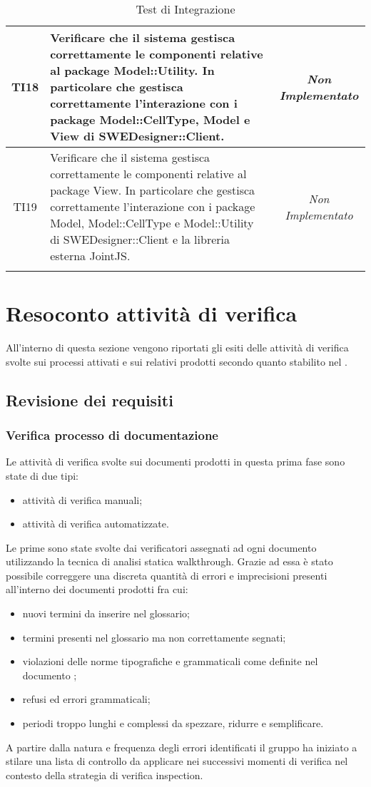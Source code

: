 \begin{longtable}{|c|>{}m{8cm}|c|}
\hypertarget{TI18}{TI18} & Verificare che il sistema gestisca correttamente le componenti relative al package Model::Utility. In particolare che gestisca correttamente l'interazione con i package Model::CellType, Model e View di SWEDesigner::Client. & \textit{Non Implementato}\\ \hline
\hypertarget{TI19}{TI19} & Verificare che il sistema gestisca correttamente le componenti relative al package View. In particolare che gestisca correttamente l'interazione con i package Model, Model::CellType e Model::Utility di SWEDesigner::Client e la libreria esterna JointJS. & \textit{Non Implementato}\\ \hline
\caption[Test di Integrazione]{Test di Integrazione}
\label{tabella:test2}
\end{longtable}
\clearpage
	



\section{Resoconto attività di verifica}
All'interno di questa sezione vengono riportati gli esiti delle attività di verifica svolte sui processi attivati e sui relativi prodotti secondo quanto stabilito nel \PdP.
	\subsection{Revisione dei requisiti}
		\subsubsection{Verifica processo di documentazione}
		Le attività di verifica svolte sui documenti prodotti in questa prima fase sono state di due tipi:
		\begin{itemize}		
			\item attività di verifica manuali;
			\item attività di verifica automatizzate.
		\end{itemize}
		
		Le prime sono state svolte dai verificatori assegnati ad ogni documento utilizzando la tecnica di 					analisi statica walkthrough. Grazie ad essa è stato possibile correggere una discreta quantità di 					errori e imprecisioni presenti all'interno dei documenti prodotti fra cui: 
		\begin{itemize}	
			\item nuovi termini da inserire nel glossario;
			\item termini presenti nel glossario ma non correttamente segnati;
			\item violazioni delle norme tipografiche e grammaticali come definite nel documento \NdP ;
			\item refusi ed errori grammaticali;
			\item periodi troppo lunghi e complessi da spezzare, ridurre e semplificare.
		\end{itemize}
		A partire dalla natura e frequenza degli errori identificati il gruppo ha iniziato a stilare una lista
		di controllo da applicare nei successivi momenti di verifica nel contesto della strategia di verifica
		inspection.

